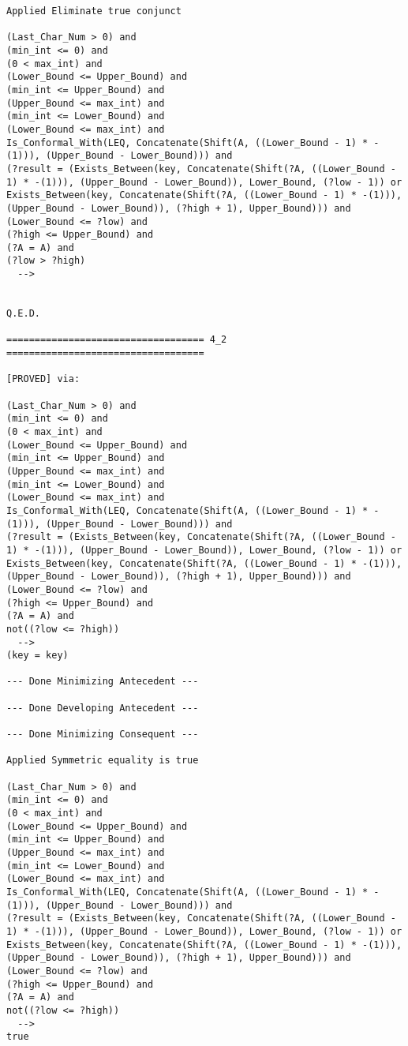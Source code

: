 \begin{lstlisting}[language=resolve]
Applied Eliminate true conjunct

(Last_Char_Num > 0) and
(min_int <= 0) and
(0 < max_int) and
(Lower_Bound <= Upper_Bound) and
(min_int <= Upper_Bound) and
(Upper_Bound <= max_int) and
(min_int <= Lower_Bound) and
(Lower_Bound <= max_int) and
Is_Conformal_With(LEQ, Concatenate(Shift(A, ((Lower_Bound - 1) * -(1))), (Upper_Bound - Lower_Bound))) and
(?result = (Exists_Between(key, Concatenate(Shift(?A, ((Lower_Bound - 1) * -(1))), (Upper_Bound - Lower_Bound)), Lower_Bound, (?low - 1)) or Exists_Between(key, Concatenate(Shift(?A, ((Lower_Bound - 1) * -(1))), (Upper_Bound - Lower_Bound)), (?high + 1), Upper_Bound))) and
(Lower_Bound <= ?low) and
(?high <= Upper_Bound) and
(?A = A) and
(?low > ?high)
  -->


Q.E.D.

=================================== 4_2 ===================================

[PROVED] via:

(Last_Char_Num > 0) and
(min_int <= 0) and
(0 < max_int) and
(Lower_Bound <= Upper_Bound) and
(min_int <= Upper_Bound) and
(Upper_Bound <= max_int) and
(min_int <= Lower_Bound) and
(Lower_Bound <= max_int) and
Is_Conformal_With(LEQ, Concatenate(Shift(A, ((Lower_Bound - 1) * -(1))), (Upper_Bound - Lower_Bound))) and
(?result = (Exists_Between(key, Concatenate(Shift(?A, ((Lower_Bound - 1) * -(1))), (Upper_Bound - Lower_Bound)), Lower_Bound, (?low - 1)) or Exists_Between(key, Concatenate(Shift(?A, ((Lower_Bound - 1) * -(1))), (Upper_Bound - Lower_Bound)), (?high + 1), Upper_Bound))) and
(Lower_Bound <= ?low) and
(?high <= Upper_Bound) and
(?A = A) and
not((?low <= ?high))
  -->
(key = key)

--- Done Minimizing Antecedent ---

--- Done Developing Antecedent ---

--- Done Minimizing Consequent ---

Applied Symmetric equality is true

(Last_Char_Num > 0) and
(min_int <= 0) and
(0 < max_int) and
(Lower_Bound <= Upper_Bound) and
(min_int <= Upper_Bound) and
(Upper_Bound <= max_int) and
(min_int <= Lower_Bound) and
(Lower_Bound <= max_int) and
Is_Conformal_With(LEQ, Concatenate(Shift(A, ((Lower_Bound - 1) * -(1))), (Upper_Bound - Lower_Bound))) and
(?result = (Exists_Between(key, Concatenate(Shift(?A, ((Lower_Bound - 1) * -(1))), (Upper_Bound - Lower_Bound)), Lower_Bound, (?low - 1)) or Exists_Between(key, Concatenate(Shift(?A, ((Lower_Bound - 1) * -(1))), (Upper_Bound - Lower_Bound)), (?high + 1), Upper_Bound))) and
(Lower_Bound <= ?low) and
(?high <= Upper_Bound) and
(?A = A) and
not((?low <= ?high))
  -->
true


\end{lstlisting}
